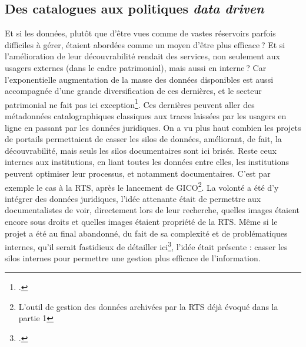 \subsection{Des catalogues aux politiques \textit{data driven}}

Et si les données, plutôt que d’être vues comme de vastes réservoirs parfois difficiles à gérer, étaient abordées comme un moyen d’être plus efficace ? Et si l’amélioration de leur découvrabilité rendait des services, non seulement aux usagers externes (dans le cadre patrimonial), mais aussi en interne ? Car l’exponentielle augmentation de la masse des données disponibles est aussi accompagnée d’une grande diversification de ces dernières, et le secteur patrimonial ne fait pas ici exception\footcite[§15 à §18]{poupeau_donnee_2016}. Ces dernières peuvent aller des métadonnées catalographiques classiques aux traces laissées par les usagers en ligne en passant par les données juridiques. On a vu plus haut combien les projets de portails permettaient de casser les silos de données, améliorant, de fait, la découvrabilité, mais seuls les silos documentaires sont ici brisés. Reste ceux internes aux institutions, en liant toutes les données entre elles, les institutions peuvent optimiser leur processus, et notamment documentaires. C’est par exemple le cas à la RTS, après le lancement de GICO\footnote{L'outil de gestion des données archivées par la RTS déjà évoqué dans la partie 1}. La volonté a été d’y intégrer des données juridiques, l’idée attenante était de permettre aux documentalistes de voir, directement lors de leur recherche, quelles images étaient encore sous droits et quelles images étaient propriété de la RTS. Même si le projet a été au final abandonné, du fait de sa complexité et de problématiques internes, qu’il serait fastidieux de détailler ici\footcite{barcella2024a}, l’idée était présente : casser les silos internes pour permettre une gestion plus efficace de l’information.

